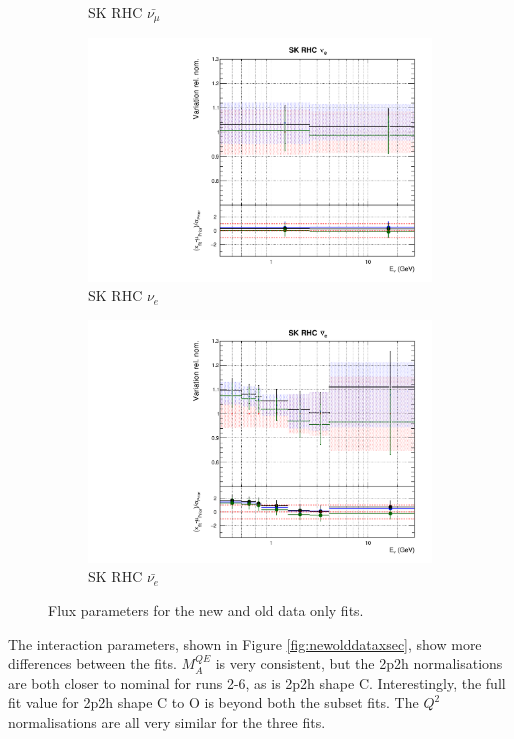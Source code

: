 \begin{figure}
\begin{subfigure}{0.24\textwidth}
  \caption{SK RHC $\bar{\nu_{\mu}}$}
\end{subfigure}
\begin{subfigure}{0.24\textwidth}
  \centering
  \includegraphics[width=0.95\linewidth]{figs/newolddatafitsflux_14}
  \caption{SK RHC $\nu_{e}$}
\end{subfigure}
\begin{subfigure}{0.24\textwidth}
  \centering
  \includegraphics[width=0.95\linewidth]{figs/newolddatafitsflux_15}
  \caption{SK RHC $\bar{\nu_e}$}
\end{subfigure}
\caption{Flux parameters for the new and old data only fits.}
\label{fig:newolddataflux}
\end{figure}

The interaction parameters, shown in Figure \ref{fig:newolddataxsec}, show more differences between the fits. $M_{A}^{QE}$ is very consistent, but the 2p2h normalisations are both closer to nominal for runs 2-6, as is 2p2h shape C. Interestingly, the full fit value for 2p2h shape C to O is beyond both the subset fits. The $Q^2$ normalisations are all very similar for the three fits.

